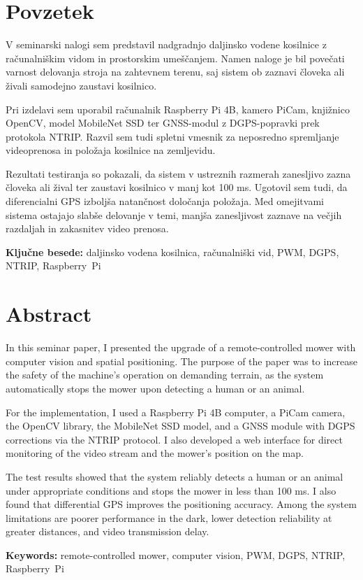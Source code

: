 \documentclass[12pt]{article}
\begin{document}
\newpage
\thispagestyle{empty}
\begin{singlespace}
\section*{Povzetek}
V seminarski nalogi sem predstavil nadgradnjo daljinsko vodene kosilnice z računalniškim vidom in prostorskim umeščanjem. Namen naloge je bil povečati varnost delovanja stroja na zahtevnem terenu, saj sistem ob zaznavi človeka ali živali samodejno zaustavi kosilnico.

Pri izdelavi sem uporabil računalnik Raspberry Pi 4B, kamero PiCam, knjižnico OpenCV, model MobileNet SSD ter GNSS-modul z DGPS-popravki prek protokola NTRIP. Razvil sem tudi spletni vmesnik za neposredno spremljanje videoprenosa in položaja kosilnice na zemljevidu.

Rezultati testiranja so pokazali, da sistem v ustreznih razmerah zanesljivo zazna človeka ali žival ter zaustavi kosilnico v manj kot 100 ms. Ugotovil sem tudi, da diferencialni GPS izboljša natančnost določanja položaja. Med omejitvami sistema ostajajo slabše delovanje v temi, manjša zanesljivost zaznave na večjih razdaljah in zakasnitev video prenosa.

\vspace{0.5cm}
\noindent\textbf{Ključne besede:} daljinsko vodena kosilnica, računalniški vid,
PWM, DGPS, NTRIP, Raspberry~Pi

\vspace{0.8cm}

\section*{Abstract}
In this seminar paper, I presented the upgrade of a remote-controlled mower with computer vision and spatial positioning. The purpose of the paper was to increase the safety of the machine's operation on demanding terrain, as the system automatically stops the mower upon detecting a human or an animal.

For the implementation, I used a Raspberry Pi 4B computer, a PiCam camera, the OpenCV library, the MobileNet SSD model, and a GNSS module with DGPS corrections via the NTRIP protocol. I also developed a web interface for direct monitoring of the video stream and the mower's position on the map.

The test results showed that the system reliably detects a human or an animal under appropriate conditions and stops the mower in less than 100 ms. I also found that differential GPS improves the positioning accuracy. Among the system limitations are poorer performance in the dark, lower detection reliability at greater distances, and video transmission delay.

\vspace{0.5cm}
\noindent\textbf{Keywords:} remote-controlled mower, computer vision, PWM, DGPS, NTRIP, Raspberry~Pi
\end{singlespace}
\end{document}
